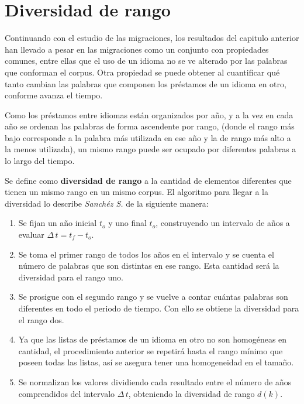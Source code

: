 \chapter{Diversidad de rango}

Continuando con el estudio de las migraciones, los resultados del capitulo anterior han llevado a pesar en las migraciones como un conjunto con propiedades comunes, entre ellas que el uso de un idioma no se ve alterado por las palabras que conforman el corpus.   Otra propiedad se puede obtener al cuantificar qué tanto cambian las palabras que componen los préstamos de un idioma en otro, conforme avanza el tiempo. 
  
Como los préstamos entre idiomas están organizados por año, y a la vez en cada año se ordenan las palabras de forma ascendente por rango, (donde el rango más bajo corresponde a la palabra más utilizada en ese año y la de rango más alto a la menos utilizada), un mismo rango puede ser ocupado por diferentes palabras a lo largo del tiempo. 

Se define como \textbf{diversidad de rango} a la cantidad de elementos  diferentes que tienen un mismo rango en un mismo corpus. El algoritmo para llegar a la diversidad lo describe \textit{Sanchéz S.} \cite{tesis.sergio} de la siguiente manera:


\begin{enumerate}
		
	\item Se fijan un año inicial $t_{o}$ y uno final $t_{o}$, construyendo un intervalo de años a evaluar $\Delta\,t = t_{f}- t_{o}$.
	
	\item Se toma el primer rango de todos los años en el intervalo y se cuenta el número de palabras que son distintas en ese rango. Esta cantidad será la diversidad para el rango uno.
	
	\item Se prosigue con el segundo rango y se vuelve a contar cuántas palabras son diferentes en todo el periodo de tiempo.  Con ello se obtiene la diversidad para el rango dos. 
	
	\item Ya que las listas de préstamos de un idioma en otro no son homogéneas en cantidad, el procedimiento anterior se repetirá hasta el rango mínimo que poseen todas las listas,  así se asegura tener una homogeneidad en el tamaño.
	
	\item Se normalizan  los valores dividiendo cada resultado entre el número de años comprendidos del intervalo $\Delta\,t$, obteniendo  la diversidad de rango $d(k)$.
	
\end{enumerate}

